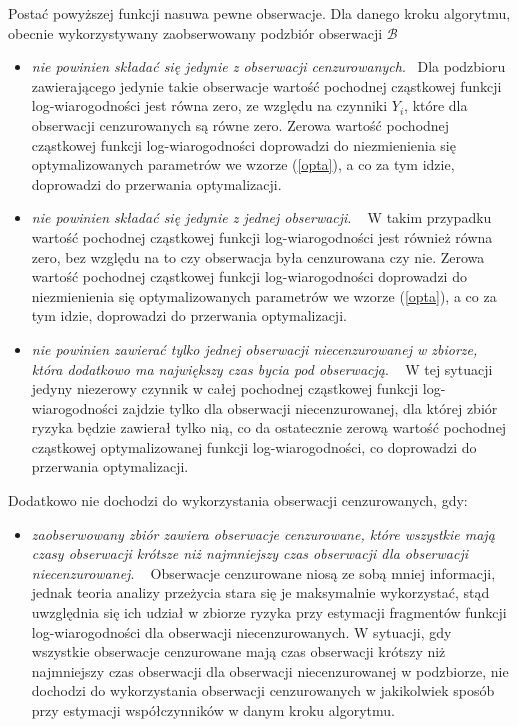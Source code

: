 Postać powyższej funkcji nasuwa pewne obserwacje. Dla danego kroku algorytmu, obecnie wykorzystywany zaobserwowany podzbiór obserwacji \(\mathcal{B}\)
\begin{itemize}
\item \textit{nie powinien składać się jedynie z obserwacji cenzurowanych}. \newline \ \newline Dla podzbioru zawierającego jedynie takie obserwacje wartość pochodnej cząstkowej funkcji log-wiarogodności jest równa zero, ze względu na czynniki $Y_i$, które dla obserwacji cenzurowanych są równe zero. Zerowa wartość pochodnej cząstkowej funkcji log-wiarogodności doprowadzi do niezmienienia się optymalizowanych parametrów we wzorze (\ref{opta}), a co za tym idzie, doprowadzi do przerwania optymalizacji.
\item \textit{nie powinien składać się jedynie z jednej obserwacji}. \newline \ \newline  
W takim przypadku wartość pochodnej cząstkowej funkcji log-wiarogodności jest również równa zero, bez względu na to czy obserwacja była cenzurowana czy nie. Zerowa wartość pochodnej cząstkowej funkcji log-wiarogodności doprowadzi do niezmienienia się optymalizowanych parametrów we wzorze (\ref{opta}), a co za tym idzie, doprowadzi do przerwania optymalizacji.
\item \textit{nie powinien zawierać tylko jednej obserwacji niecenzurowanej w zbiorze, która dodatkowo ma największy czas bycia pod obserwacją}. \newline \ \newline 
W tej sytuacji jedyny niezerowy czynnik w całej pochodnej cząstkowej funkcji log-wiarogodności zajdzie tylko dla obserwacji niecenzurowanej, dla której zbiór ryzyka będzie zawierał tylko nią, co da ostatecznie zerową wartość pochodnej cząstkowej optymalizowanej funkcji log-wiarogodności, co doprowadzi do przerwania optymalizacji.
\end{itemize}

Dodatkowo nie dochodzi do wykorzystania obserwacji cenzurowanych, gdy:
\begin{itemize}
\item \textit{zaobserwowany zbiór zawiera obserwacje cenzurowane, które wszystkie mają czasy obserwacji krótsze niż najmniejszy czas obserwacji dla obserwacji niecenzurowanej}. \newline \ \newline 
Obserwacje cenzurowane niosą ze sobą mniej informacji, jednak teoria analizy przeżycia stara się je maksymalnie wykorzystać, stąd uwzględnia się ich udział w zbiorze ryzyka przy estymacji fragmentów funkcji log-wiarogodności dla obserwacji niecenzurowanych. W sytuacji, gdy wszystkie obserwacje cenzurowane mają czas obserwacji krótszy niż najmniejszy czas obserwacji dla obserwacji niecenzurowanej w podzbiorze, nie dochodzi do wykorzystania obserwacji cenzurowanych w jakikolwiek sposób przy estymacji współczynników w danym kroku algorytmu.
\end{itemize}

